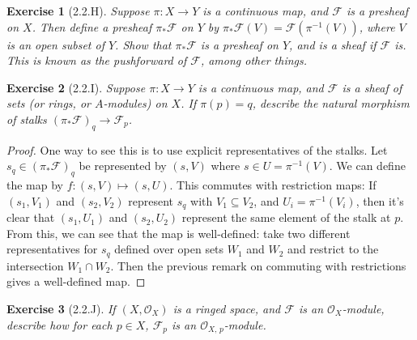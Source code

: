 \documentclass{amsart}
\newtheorem*{exercise*}{Exercise}
\begin{document}
\vspace{0.1in}


\begin{exercise*}[2.2.H]
    Suppose $\pi: X \to Y$ is a continuous map, and $\mathcal{F}$ is a presheaf on $X$.
    Then define a presheaf $\pi_*\mathcal{F}$ on $Y$ by $\pi_*\mathcal{F}(V) = \mathcal{F}(\pi^{-1}(V))$, where $V$ is an open subset of $Y$. Show that $\pi_*\mathcal{F}$ is a
    presheaf on $Y$, and is a sheaf if $\mathcal{F}$ is. This is known as the pushforward
    of $\mathcal{F}$, among other things.
\end{exercise*}

\vspace{0.1in}


\begin{exercise*}[2.2.I]
    Suppose $\pi: X \to Y$ is a continuous map, and $\mathcal{F}$ is a sheaf of sets (or rings, or $A$-modules) on $X$. If $\pi(p) = q$, describe the natural morphism of stalks
    $(\pi_*\mathcal{F})_q \to \mathcal{F}_p$.
\end{exercise*}

\begin{proof}
    One way to see this is to use explicit representatives of the stalks. Let 
    $s_q \in (\pi_*\mathcal{F})_q$ be represented by $(s, V)$ where $s \in U = \pi^{-1}(V)$.
    We can define the map by $f: (s, V) \mapsto (s, U)$. This commutes with restriction maps:
    If $(s_1, V_1)$ and $(s_2, V_2)$ represent $s_q$ with $V_1 \subseteq V_2$, and $U_i = \pi^{-1}(V_i)$, then it's clear that $(s_1, U_1)$ and $(s_2, U_2)$ represent the same
    element of the stalk at $p$. From this, we can see that the map is well-defined: take
    two different representatives for $s_q$ defined over open sets $W_1$ and $W_2$ and
    restrict to the intersection $W_1 \cap W_2$. Then the previous remark on commuting with
    restrictions gives a well-defined map.
\end{proof}

\vspace{0.1in}


\begin{exercise*}[2.2.J]
    If $(X, \mathcal{O}_X)$ is a ringed space, and $\mathcal{F}$ is an $\mathcal{O}_X$-module,
    describe how for each $p \in X$, $\mathcal{F}_p$ is an $\mathcal{O}_{X, \,p}$-module.
\end{exercise*}
\end{document}
